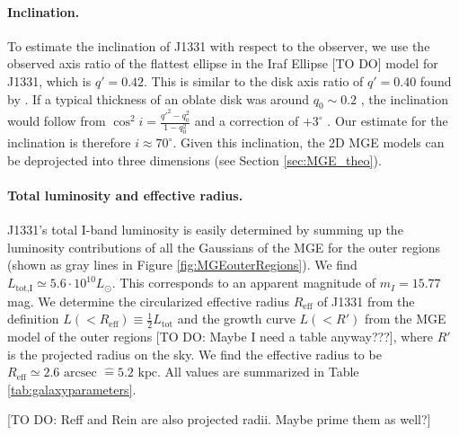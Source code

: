 \paragraph{Inclination.} To estimate the inclination of J1331 with respect to the observer, we use the observed axis ratio of the flattest ellipse in the Iraf Ellipse [TO DO] model for J1331, which is $q'=0.42$. This is similar to the disk axis ratio of $q' = 0.40$ found by \citet{SWELLSI}. If a typical thickness of an oblate disk was around $q_0 \sim 0.2$ \citep{1958MeLu2.136....1H}, the inclination would follow from $\cos^2 i = \frac{q'^2 - q_0^2}{1 - q_0^2}$ and a correction of $+3^\circ$ \citep{1988ngc..book.....T}. Our estimate for the inclination is therefore $i \approx 70^\circ$. Given this inclination, the 2D MGE models can be deprojected into three dimensions (see Section \ref{sec:MGE_theo}).

\paragraph{Total luminosity and effective radius.} J1331's total I-band luminosity is easily determined by summing up the luminosity contributions of all the Gaussians of the MGE for the outer regions (shown as gray lines in Figure \ref{fig:MGEouterRegions}). We find $L_\text{tot,I} \simeq 5.6 \cdot 10^{10} L_\odot$. This corresponds to an apparent magnitude of $m_I = 15.77$ mag. We determine the circularized effective radius $R_\text{eff}$ of J1331 from the definition $L(<R_\text{eff}) \equiv \frac 12 L_\text{tot}$ and the growth curve $L(<R')$ from the MGE model of the outer regions [TO DO: Maybe I need a table anyway???], where $R'$ is the projected radius on the sky. We find the effective radius to be $R_\text{eff} \simeq 2.6 \text{ arcsec } \hat{=} 5.2 \text{ kpc}$.  All values are summarized in Table \ref{tab:galaxyparameters}.

[TO DO: Reff and Rein are also projected radii. Maybe prime them as well?]


